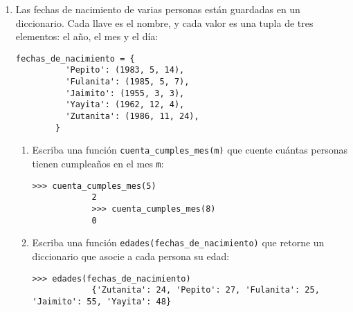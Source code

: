 \documentclass[10pt,spanish]{article}
\newcommand{\li}{\lstinline}
\begin{document}
\begin{enumerate}
    \newpage

    \item
      Las fechas de nacimiento de varias personas están guardadas en un diccionario.
      Cada llave es el nombre,
      y cada valor es una tupla de tres elementos:
      el año, el mes y el día:
      \begin{lstlisting}[gobble=8]
        fechas_de_nacimiento = {
          'Pepito': (1983, 5, 14),
          'Fulanita': (1985, 5, 7),
          'Jaimito': (1955, 3, 3),
          'Yayita': (1962, 12, 4),
          'Zutanita': (1986, 11, 24),
        }
      \end{lstlisting}

      \begin{enumerate}
        \item
          Escriba una función \li!cuenta_cumples_mes(m)!
          que cuente cuántas personas tienen cumpleaños en el mes \li!m!:
          \begin{lstlisting}[gobble=12]
            >>> cuenta_cumples_mes(5)
            2
            >>> cuenta_cumples_mes(8)
            0
          \end{lstlisting}

        \vspace{40ex}

        \item
          Escriba una función \li!edades(fechas_de_nacimiento)!
          que retorne un diccionario que asocie a cada persona
          su edad:
          \begin{lstlisting}[gobble=12]
            >>> edades(fechas_de_nacimiento)
            {'Zutanita': 24, 'Pepito': 27, 'Fulanita': 25, 'Jaimito': 55, 'Yayita': 48}
          \end{lstlisting}
        
      \end{enumerate}

  \end{enumerate}
\end{document}
